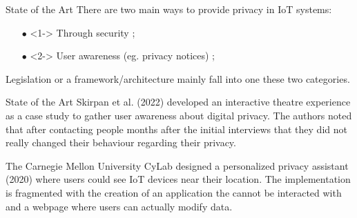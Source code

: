 \documentclass[xcolor={svgnames},compress,aspectratio=169]{beamer}
\begin{document}
\begin{frame}{State of the Art}
    \vspace*{\fill}
    There are two main ways to provide privacy in IoT systems:
    \vspace*{\fill}
    \begin{itemize}
        \item[$\bullet$]<1->
        Through security \cite{zhao2020local, zhang2017privacy, ali2017iot};
        \item[$\bullet$]<2->
        User awareness (eg. privacy notices) \cite{feng2021design, das2018personalized};
    \end{itemize}
    \vspace*{\fill}
    Legislation or a framework/architecture mainly fall into one these two categories.
    \vspace*{\fill}
\end{frame}


\begin{frame}{State of the Art}
    Skirpan et al. (2022) \cite{skirpan2022is} developed an interactive theatre
    experience as a case study to gather user awareness about digital
    privacy.
    The authors
    noted that after contacting people months after the initial interviews
    that they did not really changed their behaviour regarding
    their privacy.

    \vspace*{\fill}
    The Carnegie Mellon University CyLab designed a personalized privacy
    assistant (2020) \cite{colnago2020informing} where users could see
    IoT devices near their location. The implementation is
    fragmented with the creation of an application \cite{feng2021design} the cannot
    be interacted with and a webpage \cite{das2018personalized} where users can actually modify data.
\end{frame}
\end{document}
